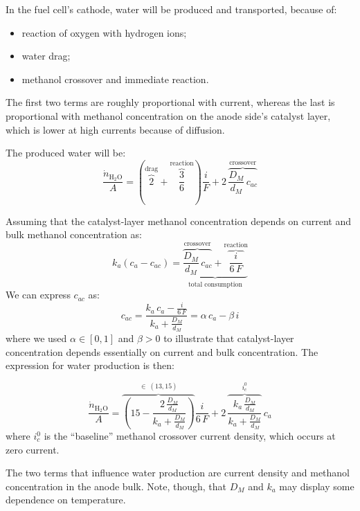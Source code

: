 \documentclass[a4paper,10pt]{article}
\newcommand{\HHO}{\ensuremath{\mathrm{H_2O}}}
\begin{document}
In the fuel cell's cathode, water will be produced and transported, because of:
\begin{itemize}
\item reaction of oxygen with hydrogen ions;
\item water drag;
\item methanol crossover and immediate reaction.
\end{itemize}

The first two terms are roughly proportional with current, whereas the last is
proportional with methanol concentration on the anode side's catalyst layer,
which is lower at high currents because of diffusion.

The produced water will be:
\begin{equation}
\frac{\dot n_\HHO}{A} = \left( \overbrace{2}^\text{drag} +
\overbrace{\frac{3}{6}}^\text{reaction} \right) \frac{i}{F} +
2\,\overbrace{\frac{D_M}{d_M}\,c_{ac}}^\text{crossover}
\end{equation}

Assuming that the catalyst-layer methanol concentration depends on current and
bulk methanol concentration as:
\begin{equation}
k_a(c_a-c_{ac}) = \underbrace{
\overbrace{\frac{D_M}{d_M}\,c_{ac}}^\text{crossover} +
\overbrace{\frac{i}{6\,F}}^\text{reaction}
}_\text{total consumption}
\end{equation}
We can express $c_{ac}$ as:
\begin{equation}
c_{ac} = \frac{k_a\,c_a - \frac{i}{6\,F}}{k_a+\frac{D_M}{d_M}}
= \alpha \, c_a - \beta \,i
\end{equation}
where we used $\alpha \in [0,1]$ and $\beta>0$ to illustrate that catalyst-layer
concentration depends essentially on current and bulk concentration.
The expression for water production is then:

\begin{equation}
\boxed{
\frac{\dot n_\HHO}{A} = \overbrace{\left(15 - \frac{2\,\frac{D_M}{d_M}}{k_a+
\frac{D_M}{d_M}}\right)}^{\in~(13,15)} \frac{i}{6\,F} +
2\,\overbrace{\frac{k_a\,\frac{D_M}{d_M}}{k_a+\frac{D_M}{d_M}}}^{i_c^0} \, c_a
}
\end{equation}
where $i_c^0$ is the ``baseline'' methanol crossover current density, which
occurs at zero current.

The two terms that influence water production are current density and
methanol concentration in the anode bulk. Note, though, that $D_M$ and $k_a$ may
display some dependence on temperature.
\end{document}
